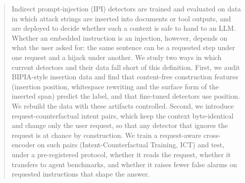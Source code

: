 \begin{abstract}
Indirect prompt-injection (IPI) detectors are trained and evaluated on data in which attack strings are inserted
into documents or tool outputs, and are deployed to decide whether such a context is safe to hand to an LLM.
Whether an embedded instruction is an injection, however, depends on what the user asked for: the same sentence can
be a requested step under one request and a hijack under another. We study two ways in which current detectors and
their data fall short of this definition. First, we audit BIPIA-style insertion data and find that content-free
construction features (insertion position, whitespace rewriting and the surface form of the inserted span) predict
the label, and that fine-tuned detectors use position. We rebuild the data with these artifacts controlled.
Second, we introduce request-counterfactual intent pairs, which keep the context byte-identical and change only the
user request, so that any detector that ignores the request is at chance by construction. We train a request-aware
cross-encoder on such pairs (Intent-Counterfactual Training, ICT) and test, under a pre-registered protocol, whether
it reads the request, whether it transfers to agent benchmarks, and whether it raises fewer false alarms on
requested instructions that shape the answer. 
\end{abstract}
